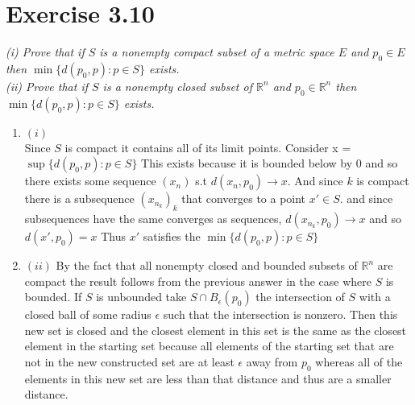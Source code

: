\documentclass{amsart}
\begin{document}
    \section{Exercise 3.10}
    \emph{(i) Prove that if $S$ is a nonempty compact subset of a metric space $E$ and $p_0 \in E$ then $\min\{d(p_0,p) : p \in S\} $ exists.\\
        (ii) Prove that if $S$ is a nonempty closed subset of $ \mathbb{R}^{n}$ and $p_0 \in \mathbb{R}^{n}$ then $\min\{d(p_0,p) : p \in S\}$ exists.
    }
    \begin{enumerate}
        \item $(i)$ \\
            Since $S$ is compact it contains all of its limit points. Consider x =   $\sup\{d(p_0,p) : p \in S\}$ This exists because it is bounded below by $0$ and so there exists some sequence $(x_n)$ s.t
            $d(x_n,p_0) \rightarrow x$. And since $k$ is compact there is a subsequence $(x_{n_k})_k$ that converges to a point $x' \in S$. and since subsequences have the same converges as sequences,
            $d(x_{n_k}, p_0) \rightarrow x$ and so $d(x',p_0) = x$ Thus $x'$ satisfies the $\min\{d(p_0,p) : p \in S\}$

        \item $(ii)$
            By the fact that all nonempty closed and bounded subsets of  $ \mathbb{R}^{n}$ are compact the result follows from the previous answer in the case where $S$ is bounded.
            If $S$ is unbounded take $S \cap B_\epsilon(p_0)$ the intersection of $S$ with a closed ball of some radius  $\epsilon $ such that the intersection is nonzero. Then this new set is closed
            and the closest element in this set is the same as the closest element in the starting set because all elements of the starting set that are not in the new constructed set are at least  $\epsilon $ away from $p_0$ whereas
            all of the elements in this new set are less than that distance and thus are a smaller distance.
            
    \end{enumerate}
\end{document}
